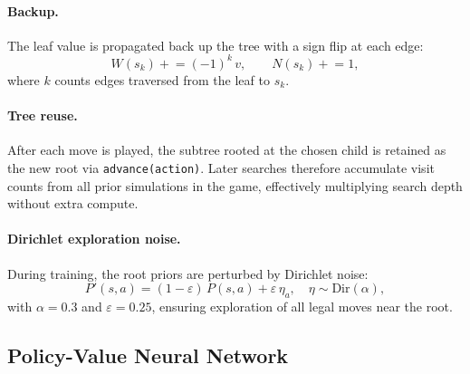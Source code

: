 \documentclass[11pt,a4paper]{article}
\begin{document}
\paragraph{Backup.}
The leaf value is propagated back up the tree with a sign flip at each edge:
\begin{equation}
  W(s_k) \mathrel{+}= (-1)^{k}\,v, \qquad N(s_k) \mathrel{+}= 1,
\end{equation}
where $k$ counts edges traversed from the leaf to $s_k$.

\paragraph{Tree reuse.}
After each move is played, the subtree rooted at the chosen child is retained as
the new root via \texttt{advance(action)}.  Later searches therefore accumulate
visit counts from all prior simulations in the game, effectively multiplying
search depth without extra compute.

\paragraph{Dirichlet exploration noise.}
During training, the root priors are perturbed by Dirichlet noise:
\begin{equation}
  P'(s,a) = (1-\varepsilon)\,P(s,a) + \varepsilon\,\eta_a,
  \quad \eta \sim \mathrm{Dir}(\alpha),
\end{equation}
with $\alpha = 0.3$ and $\varepsilon = 0.25$, ensuring exploration of all legal
moves near the root.

\subsection{Policy-Value Neural Network}
\end{document}
